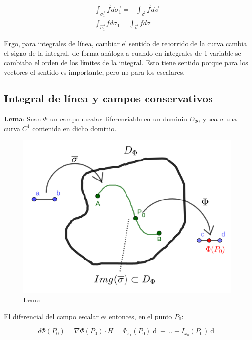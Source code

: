 \documentclass{article}
\begin{document}
\begin{gather}
\int_{\overrightarrow{\sigma_1}} \overrightarrow{f} d\overrightarrow{\sigma_1} = - \int_{\overrightarrow{\sigma}} \overrightarrow{f} d\overrightarrow{\sigma} \\
\int_{\overrightarrow{\sigma_1}} f d\sigma_1 = \int_{\overrightarrow{\sigma}} f d\sigma
\end{gather}

Ergo, para integrales de línea, cambiar el sentido de recorrido de la curva cambia el signo de la integral, de forma análoga a cuando en integrales de 1 variable se cambiaba el orden de los límites de la integral. Esto tiene sentido porque para los vectores el sentido es importante, pero no para los escalares.

\subsection{Integral de línea y campos conservativos}

\textbf{Lema}: Sean $\Phi$ un campo escalar diferenciable en un dominio $D_{\Phi}$, y sea $\sigma$ una curva $C^1$ contenida en dicho dominio. 

\begin{figure}[ht]
\centering
\caption{Lema}
\includegraphics[scale=0.75]{img/integrales/campos_conservativos.png}
\end{figure}

El diferencial del campo escalar es entonces, en el punto $P_0$:

\begin{equation}
d\Phi(P_0) = \nabla\Phi(P_0) \cdot H = \Phi_{x_1}(P_0) \mathop{dx_1} + \ldots + I_{x_n}(P_0) \mathop{dx_n} 
\end{equation}
\end{document}
